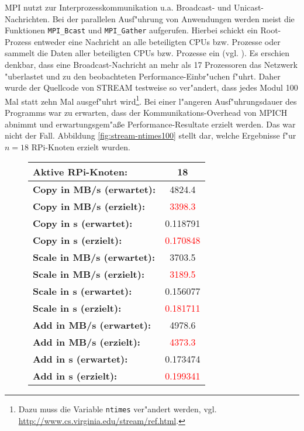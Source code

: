 \begin{enumerate}
MPI nutzt zur Interprozesskommunikation u.a. Broadcast- und Unicast-Nachrichten. Bei der parallelen Ausf"uhrung von Anwendungen werden meist die Funktionen \texttt{MPI\_\-Bcast} und \texttt{MPI\_Gather} aufgerufen. Hierbei schickt ein Root-Prozess entweder eine Nachricht an alle beteiligten CPUs bzw. Prozesse oder sammelt die Daten aller beteiligten CPUs bzw. Prozesse ein (vgl. \cite{pie12}). Es erschien denkbar, dass eine Broadcast-Nachricht an mehr als 17 Prozessoren das Netzwerk "uberlastet und zu den beobachteten Performance-Einbr"uchen f"uhrt. Daher wurde der Quellcode von STREAM testweise so ver"andert, dass jedes Modul 100 Mal statt zehn Mal ausgef"uhrt wird\footnote{Dazu muss die Variable \texttt{ntimes} ver"andert werden, vgl. \url{http://www.cs.virginia.edu/stream/ref.html}.}. Bei einer l"angeren Ausf"uhrungsdauer des Programms war zu erwarten, dass der Kommunikations-Overhead von MPICH abnimmt und erwartungsgem"a\ss e Performance-Resultate erzielt werden. Das war nicht der Fall. Abbildung \ref{fig:stream-ntimes100} stellt dar, welche Ergebnisse f"ur $n=18$ RPi-Knoten erzielt wurden. 
\begin{figure}[H]
  \centering
  \begin{tabular}{|l|c|}
    \hline 
    \textbf{Aktive RPi-Knoten:} & \textbf{18}\\ 
    \hline 
    \textbf{Copy in MB/s (erwartet):} & 4824.4\\
    \hline 
    \textbf{Copy in MB/s (erzielt):} & \textcolor{red}{3398.3}\\
    \hline 
    \textbf{Copy in s (erwartet):} & 0.118791\\
    \hline 
    \textbf{Copy in s (erzielt):} & \textcolor{red}{0.170848}\\
    \hline 
    \textbf{Scale in MB/s (erwartet):} & 3703.5\\
    \hline 
    \textbf{Scale in MB/s (erzielt):} & \textcolor{red}{3189.5}\\
    \hline 
	\textbf{Scale in s (erwartet):} & 0.156077\\
    \hline 
    \textbf{Scale in s (erzielt):} & \textcolor{red}{0.181711}\\
    \hline 
    \textbf{Add in MB/s (erwartet):} & 4978.6\\
    \hline 
    \textbf{Add in MB/s (erzielt):}& \textcolor{red}{4373.3}\\
    \hline 
    \textbf{Add in s (erwartet):} & 0.173474\\
    \hline 
    \textbf{Add in s (erzielt):} & \textcolor{red}{0.199341}\\

\end{tabular}
\end{figure}
\end{enumerate}
